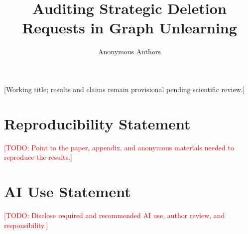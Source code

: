 \documentclass{article}
\title{Auditing Strategic Deletion Requests in Graph Unlearning}
\author{Anonymous Authors}
\newcommand{\todo}[1]{\textcolor{red}{[TODO: #1]}}
\newcommand{\draftnote}[1]{\textcolor{blue!70!black}{[#1]}}
\begin{document}
\maketitle
\draftnote{Working title; results and claims remain provisional pending scientific review.}












\section*{Reproducibility Statement}
\todo{Point to the paper, appendix, and anonymous materials needed to reproduce the results.}

\section*{AI Use Statement}
\todo{Disclose required and recommended AI use, author review, and responsibility.}




\appendix

\end{document}
